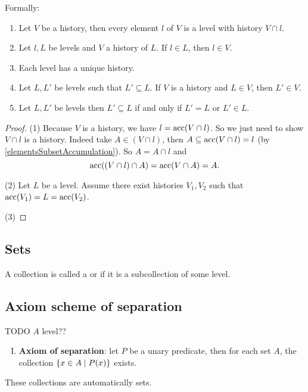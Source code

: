 Formally:
\begin{proposition}
\begin{enumerate}
\item Let $V$ be a history, then every element $l$ of $V$ is a level with history $V\cap l$.

\item Let $l,L$ be levels and $V$ a history of $L$. If $l\in L$, then $l\in V$.

\item Each level has a unique history.

\item Let $L, L'$ be levels such that $L' \subseteq L$. If $V$ is a history and $L\in V$, then $L'\in V$.
\item Let $L, L'$ be levels then $L'\subseteq L$ \textup{if and only if} $L' = L$ or $L'\in L$.
\end{enumerate}
\end{proposition}
\begin{proof}
(1) Because $V$ is a history, we have $l = \operatorname{acc}(V\cap l)$. So we just need to show $V\cap l$ is a history. Indeed take $A\in (V\cap l)$, then $A \subseteq \operatorname{acc}(V\cap l) = l$ (by \ref{elementsSubsetAccumulation}). So $A = A\cap l$ and
\[ \operatorname{acc}((V\cap l)\cap A) = \operatorname{acc}(V\cap A) = A. \]

(2) Let $L$ be a level. Assume there exist histories $V_1, V_2$ such that $\operatorname{acc}(V_1) = L = \operatorname{acc}(V_2)$.

(3)
\end{proof}




\subsection{Sets}
\begin{definition}
A collection is called a  or  if it is a subcollection of some level.
\end{definition}

\subsection{Axiom scheme of separation}
TODO $A$ level??
\begin{enumerate}[(I)]
\item \textbf{Axiom of separation}: let $P$ be a unary predicate, then for each set $A$, the collection $\left\{ x\in A \;\middle|\; P(x) \right\}$ exists.
\end{enumerate}
These collections are automatically sets.

